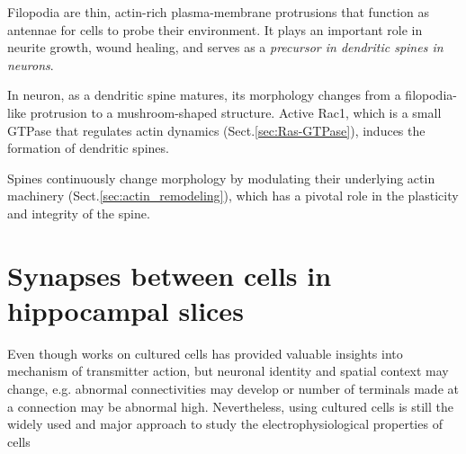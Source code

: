 Filopodia are thin, actin-rich plasma-membrane protrusions that function as
antennae for cells to probe their environment.
It plays an important role in neurite growth, wound healing, and serves as a
{\it precursor in dendritic spines in neurons}. \citep{mattila2008}

In neuron, as a dendritic spine matures, its morphology changes from a
filopodia-like protrusion to a mushroom-shaped structure. Active Rac1, which is
a small GTPase  that  regulates  actin  dynamics (Sect.\ref{sec:Ras-GTPase}), 
induces the formation of dendritic  spines.
 
Spines continuously change morphology  by  modulating  their  underlying  actin
machinery (Sect.\ref{sec:actin_remodeling}), which has a pivotal role in the
plasticity and integrity of the spine.


\section{Synapses between cells in hippocampal slices}
\label{sec:synaps-betw-cells}

Even though works on cultured cells has provided valuable insights
into mechanism of transmitter action, but neuronal identity and
spatial context may change, e.g. abnormal connectivities may develop
or number of terminals made at a connection may be abnormal high.
Nevertheless, using cultured cells is still the widely used and major
approach to study the electrophysiological properties of cells


